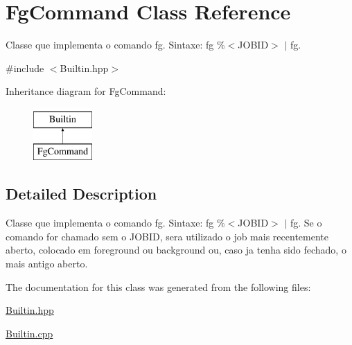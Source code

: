\hypertarget{classFgCommand}{
\section{FgCommand Class Reference}
\label{classFgCommand}
}


Classe que implementa o comando fg. Sintaxe: fg \%$<$JOBID$>$ $|$ fg.  




{\ttfamily \#include $<$Builtin.hpp$>$}

Inheritance diagram for FgCommand:\begin{figure}[H]
\begin{center}
\leavevmode
\includegraphics[height=2.000000cm]{classFgCommand}
\end{center}
\end{figure}


\subsection{Detailed Description}
Classe que implementa o comando fg. Sintaxe: fg \%$<$JOBID$>$ $|$ fg. Se o comando for chamado sem o JOBID, sera utilizado o job mais recentemente aberto, colocado em foreground ou background ou, caso ja tenha sido fechado, o mais antigo aberto. 

The documentation for this class was generated from the following files:\begin{DoxyCompactItemize}
\item 
\hyperlink{Builtin_8hpp}{Builtin.hpp}\item 
\hyperlink{Builtin_8cpp}{Builtin.cpp}\end{DoxyCompactItemize}
